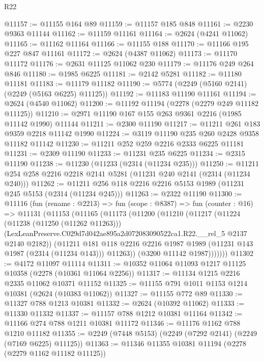 \begin{lexlean}{R22}
\begin{coremodule}
@11157 := @11155 @164 @89
@11159 := @11157 @185 @848
@11161 := @2230 @9363 @11144
@11162 := @11159 @11161
@11164 := @2624 (@4241 @11062)
@11165 := @11162 @11164
@11166 := @11155 @188
@11170 := @11166 @195 @227 @847 @11161
@11172 := @2624 (@4387 @11062)
@11173 := @11170 @11172
@11176 := @2631 @11125 @11062 @230
@11179 := @11176 @249 @264 @846
@11180 := @1985 @6225
@11181 := @2142 @5281
@11182 := @11180 @11181
@11183 := @11179 @11182
@11190 := @5774 (@2249 (@5160 @2141) (@2249 (@5163 @6225) @11125))
@11192 := @11183 @11190 @11161
@11194 := @2624 (@4540 @11062)
@11200 := @11192 @11194 (@2278 (@2279 @249 @11182 @11125))
@11210 := @2971 @11190 @167 @155 @263 @9361 @2216 (@1985 @11142 @1990) @11144
@11211 := @2300 @11190
@11217 := @11211 @261 @183 @9359 @2218 @11142 @1990
@11224 := @3119 @11190 @235 @260 @2428 @9358 @11182 @11142
@11230 := @11211 @252 @259 @2216 @2333 @6225 @11181
@11231 := @2309 @11190
@11233 := @11231 @235 @6225
@11234 := @2315 @11190
@11238 := @11230 (@11233 (@2314 (@11234 @235)))
@11250 := @11211 @254 @258 @2216 @2218 @2141 @5281 (@11231 @240 @2141 (@2314 (@11234 @240)))
@11262 := @11211 @256 @118 @2216 @2216 @5153 @1989 (@11231 @245 @5153 (@2314 (@11234 @245)))
@11263 := @2322 @11190
@11300 := @11116
    (fun (rename : @2213) =>
    fun (scope : @8387) =>
    fun (counter : @16) =>
    @11131
      (@11153
        (@11165
          (@11173
            (@11200
              (@11210
                (@11217
                  (@11224
                    (@11238 (@11250 (@11262 @11263)))
                    (LexLeanPreserve.C029d7d042ae895a2d072083090522ca1.R22.__rel_5
                      @2137
                      @2140
                      @2182))
                  (@11211
                    @181
                    @118
                    @2216
                    @2216
                    @1987
                    @1989
                    (@11231 @143 @1987 (@2314 (@11234 @143)))
                    @11263))
                (@3200 @11142 @1987)))))))
@11302 := @4172 @11097 @11114
@11311 := @10352 @11064 @11093 @1217 @11125 @10358 (@2278 (@10361 @11064 @2256))
@11317 := @11134 @1215 @2216 @2335 @11062 @10371 @11152
@11325 := @11155 @791 @1011 @1153 @1214 @10381 (@2624 (@10383 @11062))
@11327 := @11155 @772 @89
@11330 := @11327 @788 @1213 @10381
@11332 := @2624 (@10392 @11062)
@11333 := @11330 @11332
@11337 := @11157 @788 @1212 @10381 @11164
@11342 := @11166 @274 @788 @1211 @10381 @11172
@11346 := @11176 @1162 @788 @1210 @11182
@11355 := @2249 (@7448 @5153) (@2249 (@7292 @2141) (@2249 (@7169 @6225) @11125))
@11363 := @11346 @11355 @10381 @11194 (@2278 (@2279 @1162 @11182 @11125))

\end{coremodule}
\end{lexlean}
